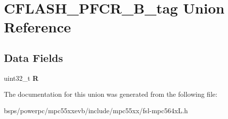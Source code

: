 \hypertarget{unionCFLASH__PFCR__32B__tag}{}\section{C\+F\+L\+A\+S\+H\+\_\+\+P\+F\+C\+R\+\_\+B\+\_\+tag Union Reference}
\label{unionCFLASH__PFCR__32B__tag}
\subsection*{Data Fields}
\begin{DoxyCompactItemize}
\item 
\mbox{\label{unionCFLASH__PFCR__32B__tag_a78e0f3dc9c75f3560d79164338fea3dd}} 
uint32\+\_\+t {\bfseries R}
\end{DoxyCompactItemize}


The documentation for this union was generated from the following file\+:\begin{DoxyCompactItemize}
\item 
bsps/powerpc/mpc55xxevb/include/mpc55xx/fsl-\/mpc564x\+L.\+h\end{DoxyCompactItemize}
